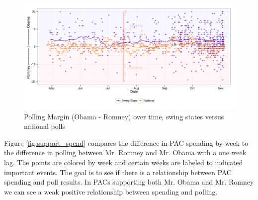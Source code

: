 \documentclass[11pt]{article}\usepackage{graphicx, color}
\newenvironment{knitrout}{}{} %
\begin{document}
\begin{knitrout}
\color{fgcolor}\begin{figure}[H]


{\centering \includegraphics[width=\textwidth]{figure/effect_plot} 

}

\caption[Polling Margin (Obama - Romney) over time, swing states versus national polls]{Polling Margin (Obama - Romney) over time, swing states versus national polls\label{fig:effect_plot}}
\end{figure}

\end{knitrout}


Figure \ref{fig:support_spend} compares the difference in PAC spending by week to the difference in polling between Mr. Romney and Mr. Obama with a one week lag. The points are colored by week and certain weeks are labeled to indicated important events. The goal is to see if there is a relationship between PAC spending and poll results. In PACs supporting both Mr. Obama and Mr. Romney we can see a weak positive relationship between spending and polling.
\end{document}
